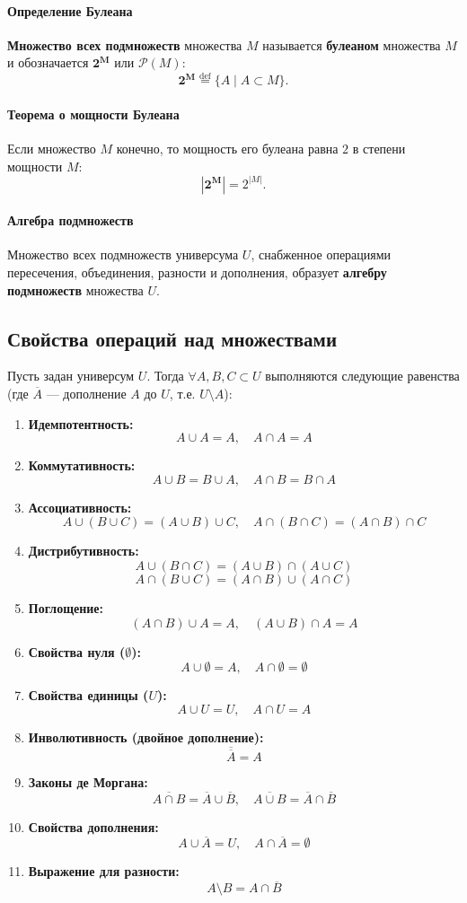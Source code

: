 \paragraph{Определение Булеана}
\textbf{Множество всех подмножеств} множества $M$ называется \textbf{булеаном} множества $M$ и обозначается $\mathbf{2^M}$ или $\mathcal{P}(M)$:
$$\mathbf{2^M} \stackrel{\text{def}}{=} \{A \mid A \subset M\}.$$

\paragraph{Теорема о мощности Булеана}
Если множество $M$ конечно, то мощность его булеана равна $2$ в степени мощности $M$:
$$| \mathbf{2^M} | = 2^{|M|}.$$

\paragraph{Алгебра подмножеств}
Множество всех подмножеств универсума $U$, снабженное операциями пересечения, объединения, разности и дополнения, образует \textbf{алгебру подмножеств} множества $U$.

\subsection*{Свойства операций над множествами}

Пусть задан универсум $U$. Тогда $\forall A, B, C \subset U$ выполняются следующие равенства (где $\overline{A}$ --- дополнение $A$ до $U$, т.е. $U \setminus A$):

\begin{enumerate}
    \item \textbf{Идемпотентность:}
    $$A \cup A = A, \quad A \cap A = A$$
    \item \textbf{Коммутативность:}
    $$A \cup B = B \cup A, \quad A \cap B = B \cap A$$
    \item \textbf{Ассоциативность:}
    $$A \cup (B \cup C) = (A \cup B) \cup C, \quad A \cap (B \cap C) = (A \cap B) \cap C$$
    \item \textbf{Дистрибутивность:}
    $$A \cup (B \cap C) = (A \cup B) \cap (A \cup C)$$
    $$A \cap (B \cup C) = (A \cap B) \cup (A \cap C)$$
    \item \textbf{Поглощение:}
    $$(A \cap B) \cup A = A, \quad (A \cup B) \cap A = A$$
    \item \textbf{Свойства нуля ($\emptyset$):}
    $$A \cup \emptyset = A, \quad A \cap \emptyset = \emptyset$$
    \item \textbf{Свойства единицы ($U$):}
    $$A \cup U = U, \quad A \cap U = A$$
    \item \textbf{Инволютивность (двойное дополнение):}
    $$\overline{\overline{A}} = A$$
    \item \textbf{Законы де Моргана:}
    $$\overline{A \cap B} = \overline{A} \cup \overline{B}, \quad \overline{A \cup B} = \overline{A} \cap \overline{B}$$
    \item \textbf{Свойства дополнения:}
    $$A \cup \overline{A} = U, \quad A \cap \overline{A} = \emptyset$$
    \item \textbf{Выражение для разности:}
    $$A \setminus B = A \cap \overline{B}$$
\end{enumerate}
